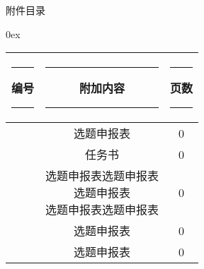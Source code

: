 \renewcommand{\tablename}{}

\begin{table}[h]
\vskip 20pt

\centering
{\fontsize{16}{16} 附件目录}

\vskip 28pt

\fontsize{11}{16}\selectfont

\newcommand{\attachment}{\stepcounter{attachment}\arabic{attachment}}
\arrayskip 0ex

\begin{center}
\begin{tabular}{|c|c|c|}\hline
 \rule{1em}{0em} 编号 \rule{1em}{0em} &
\rule{8em}{0em} 附加内容 \rule{8em}{0em} & 
\rule{1.5em}{0em} 页数 \rule{1.5em}{0em} \\\hline

\attachment &  选题申报表 & 0 \\\hline
\attachment &  任务书 & 0 \\\hline
\attachment &  \makecell{选题申报表选题申报表\\选题申报表\\选题申报表选题申报表} & 0 \\\hline
\attachment &  选题申报表 & 0 \\\hline
\attachment &  选题申报表 & 0 \\\hline

\end{tabular}
\end{center}
\end{table}